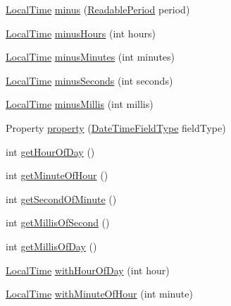 \begin{DoxyCompactItemize}
\item 
\hyperlink{classorg_1_1joda_1_1time_1_1_local_time}{Local\-Time} \hyperlink{classorg_1_1joda_1_1time_1_1_local_time_a3da0f8196c278899496094871ac392ca}{minus} (\hyperlink{interfaceorg_1_1joda_1_1time_1_1_readable_period}{Readable\-Period} period)
\item 
\hyperlink{classorg_1_1joda_1_1time_1_1_local_time}{Local\-Time} \hyperlink{classorg_1_1joda_1_1time_1_1_local_time_a598589d9f4a7c950052244d53422c8da}{minus\-Hours} (int hours)
\item 
\hyperlink{classorg_1_1joda_1_1time_1_1_local_time}{Local\-Time} \hyperlink{classorg_1_1joda_1_1time_1_1_local_time_a6f9492fb13fa2c13b68167a5ea2c2a45}{minus\-Minutes} (int minutes)
\item 
\hyperlink{classorg_1_1joda_1_1time_1_1_local_time}{Local\-Time} \hyperlink{classorg_1_1joda_1_1time_1_1_local_time_ab9cfaa0a50a167f7d0d9b09d39ca0520}{minus\-Seconds} (int seconds)
\item 
\hyperlink{classorg_1_1joda_1_1time_1_1_local_time}{Local\-Time} \hyperlink{classorg_1_1joda_1_1time_1_1_local_time_a69b7b8a886f5c65e0626b101b888d6a8}{minus\-Millis} (int millis)
\item 
Property \hyperlink{classorg_1_1joda_1_1time_1_1_local_time_a8ba5458d464c3cf32d633bc74caa8ca0}{property} (\hyperlink{classorg_1_1joda_1_1time_1_1_date_time_field_type}{Date\-Time\-Field\-Type} field\-Type)
\item 
int \hyperlink{classorg_1_1joda_1_1time_1_1_local_time_a2092b53e647111d9a3061765c4ed5b55}{get\-Hour\-Of\-Day} ()
\item 
int \hyperlink{classorg_1_1joda_1_1time_1_1_local_time_a9bf59adeac056ea0225b1cf4aac7fa54}{get\-Minute\-Of\-Hour} ()
\item 
int \hyperlink{classorg_1_1joda_1_1time_1_1_local_time_a81ac700bf40ce26dabbbd70f05819321}{get\-Second\-Of\-Minute} ()
\item 
int \hyperlink{classorg_1_1joda_1_1time_1_1_local_time_a5ee01840f373f30fc17197e770ed6c03}{get\-Millis\-Of\-Second} ()
\item 
int \hyperlink{classorg_1_1joda_1_1time_1_1_local_time_ac9e4512f7fc67340ed1b18f0dce94dbf}{get\-Millis\-Of\-Day} ()
\item 
\hyperlink{classorg_1_1joda_1_1time_1_1_local_time}{Local\-Time} \hyperlink{classorg_1_1joda_1_1time_1_1_local_time_afea41511d5baba823d2fc6f70f50e264}{with\-Hour\-Of\-Day} (int hour)
\item 
\hyperlink{classorg_1_1joda_1_1time_1_1_local_time}{Local\-Time} \hyperlink{classorg_1_1joda_1_1time_1_1_local_time_a6a177914b21f6d31652c2c97975aa8c4}{with\-Minute\-Of\-Hour} (int minute)

\end{DoxyCompactItemize}

